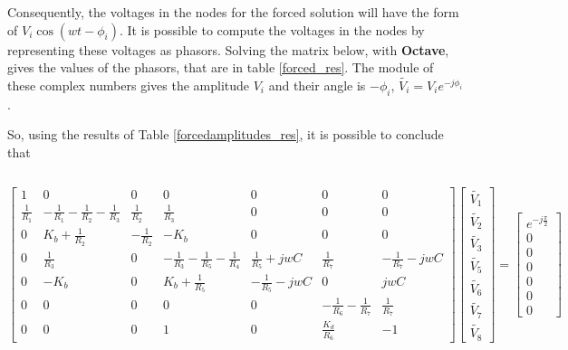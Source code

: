 
Consequently, the voltages in the nodes for the forced solution will have the form of $V_i\cos(wt-\phi_i)$. It is possible to compute the voltages in the nodes by representing these voltages as phasors. Solving the matrix below, with {\bf Octave}, gives the values of the phasors, that are in table \ref{forced_res}. The module of these complex numbers gives the amplitude $V_i$ and their angle is $-\phi_i$, $\widetilde{V_i} = V_ie^{-j\phi_i}$.

So, using the results of Table \ref{forcedamplitudes_res}, it is possible to conclude that

\begin{equation}
  
\end{equation}


\begin{equation}
  \begin{bmatrix}
    1 & 0 & 0 & 0 & 0 & 0 & 0 \\
    \frac{1}{R_1} & -\frac{1}{R_1}-\frac{1}{R_2}-\frac{1}{R_3} & \frac{1}{R_2} & \frac{1}{R_3} & 0 & 0 & 0 \\
    0 & K_b + \frac{1}{R_2} & -\frac{1}{R_2} & -K_b & 0 & 0 & 0 \\
    0 & \frac{1}{R_3} & 0 & -\frac{1}{R_3}-\frac{1}{R_5}-\frac{1}{R_4} & \frac{1}{R_5}+jwC & \frac{1}{R_7} & -\frac{1}{R_7}-jwC \\
    0 & -K_b & 0 & K_b+\frac{1}{R_5} & -\frac{1}{R_5}-jwC & 0 & jwC \\
    0 & 0 & 0 & 0 & 0 & -\frac{1}{R_6}-\frac{1}{R_7} & \frac{1}{R_7} \\
    0 & 0 & 0 & 1 & 0 & \frac{K_d}{R_6} & -1     
  \end{bmatrix}
  \begin{bmatrix}
    \widetilde{V_1} \\
    \widetilde{V_2} \\
    \widetilde{V_3} \\
    \widetilde{V_5} \\
    \widetilde{V_6} \\
    \widetilde{V_7} \\
    \widetilde{V_8}
  \end{bmatrix}
  =
  \begin{bmatrix}
    e^{-j\frac{\pi}{2}} \\
    0 \\
    0 \\
    0 \\
    0 \\
    0 \\
    0
  \end{bmatrix}
  \label{pha}
\end{equation}

